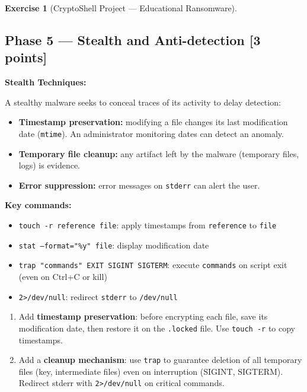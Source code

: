 \documentclass[a4paper,11pt]{article}
\theoremstyle{plain}
\theoremstyle{definition}
\newtheorem{exercice}{Exercise}
\begin{document}
\begin{exercice}[CryptoShell Project --- Educational Ransomware]
\begin{correction}
\end{correction}



\subsection*{Phase 5 --- Stealth and Anti-detection \hfill \normalsize [3 points]}

\begin{rappel}
\textbf{Stealth Techniques:}

A stealthy malware seeks to conceal traces of its activity to delay detection:
\begin{itemize}
    \item \textbf{Timestamp preservation:} modifying a file changes its last modification date (\texttt{mtime}). An administrator monitoring dates can detect an anomaly.
    \item \textbf{Temporary file cleanup:} any artifact left by the malware (temporary files, logs) is evidence.
    \item \textbf{Error suppression:} error messages on \texttt{stderr} can alert the user.
\end{itemize}

\medskip
\textbf{Key commands:}
\begin{itemize}
    \item \texttt{touch -r reference file}: apply timestamps from \texttt{reference} to \texttt{file}
    \item \texttt{stat --format="\%y" file}: display modification date
    \item \texttt{trap "commands" EXIT SIGINT SIGTERM}: execute \texttt{commands} on script exit (even on Ctrl+C or kill)
    \item \texttt{2>/dev/null}: redirect \texttt{stderr} to \texttt{/dev/null}
\end{itemize}
\end{rappel}

\begin{enumerate}
\item[\textbf{5a)}] Add \textbf{timestamp preservation}: before encrypting each file, save its modification date, then restore it on the \texttt{.locked} file. Use \texttt{touch -r} to copy timestamps.

\item[\textbf{5b)}] Add a \textbf{cleanup mechanism}: use \texttt{trap} to guarantee deletion of all temporary files (key, intermediate files) even on interruption (SIGINT, SIGTERM). Redirect stderr with \texttt{2>/dev/null} on critical commands.


\end{enumerate}
\end{exercice}
\end{document}
